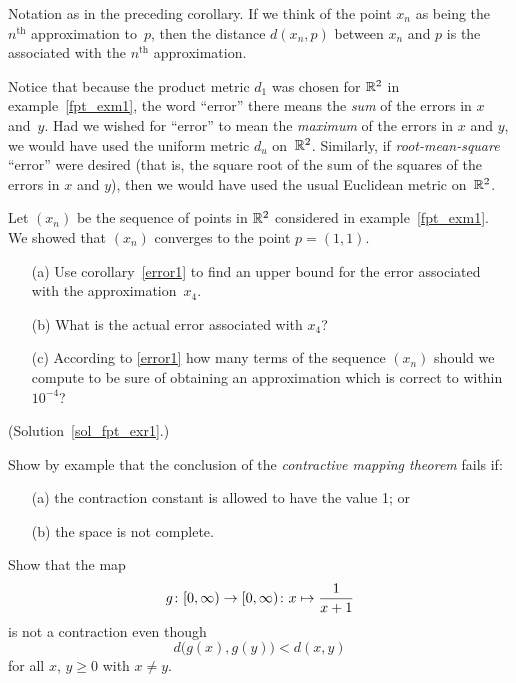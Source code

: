 \begin{defn} Notation as in the preceding corollary.  If we think of the point $x_n$ as being the
$n^{\text{th}}$ approximation to~$p$, then the distance $d(x_n,p)$ between $x_n$ and $p$ is the
 associated with the $n^{\text{th}}$ approximation.
\end{defn}

Notice that because the product metric $d_1$ was chosen for $\mathbb{R}^2$ in example~\ref{fpt_exm1}, the
word ``error'' there means the \emph{sum} of the errors in $x$ and~$y$.  Had we wished for
``error'' to mean the \emph{maximum} of the errors in $x$ and $y$, we would have used the uniform
metric $d_u$ on~$\mathbb{R}^2$.  Similarly, if \emph{root-mean-square} ``error'' were desired (that is, the
square root of the sum of the squares of the errors in $x$ and $y$), then we would have used the
usual Euclidean metric on~$\mathbb{R}^2$.

\begin{exer}\label{fpt_exr1} Let $(x_n)$ be the sequence of points in $\mathbb{R}^2$ considered in
example~\ref{fpt_exm1}.  We showed that $(x_n)$ converges to the point $p = (1,1)$.
 \begin{enumerate}
  \item[(a)] Use corollary~\ref{error1} to find an upper bound for the error associated with the
approximation~$x_4$.
  \item[(b)] What is the actual error associated with $x_4$?
  \item[(c)] According to \ref{error1} how many terms of the sequence $(x_n)$ should we compute to
be sure of obtaining an approximation which is correct to within~$10^{-4}$?
 \end{enumerate}
(Solution~\ref{sol_fpt_exr1}.)
\end{exer}

\begin{prob} Show by example that the conclusion of the \emph{contractive mapping theorem} fails if:
 \begin{enumerate}
  \item[(a)] the contraction constant is allowed to have the value 1; or
  \item[(b)] the space is not complete.
 \end{enumerate}
\end{prob}

\begin{prob} Show that the map
  \[ g \colon [0, \infty) \rightarrow [0, \infty) \colon x \mapsto \frac 1{x+1} \]
is not a contraction even though
  \[ d\bigl(g(x),g(y)\bigr) < d(x,y) \]
for all $x$, $y \ge 0$ with $x \ne y$.
\end{prob}

